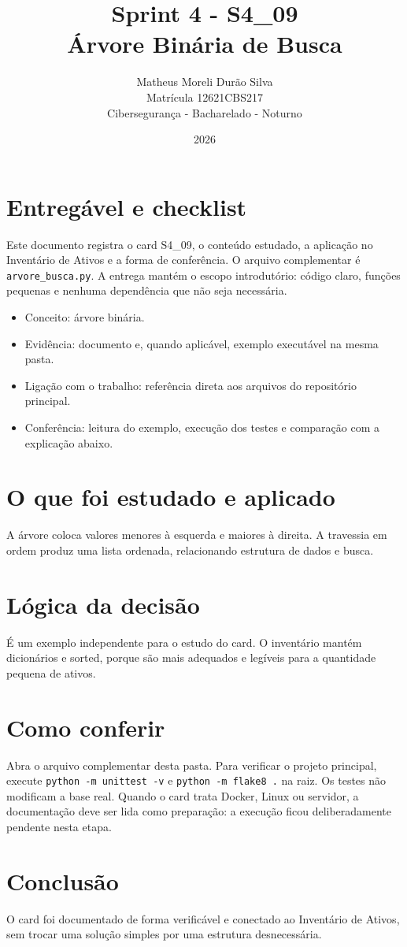 \documentclass[12pt]{article}
\title{Sprint 4 - S4\_09\\Árvore Binária de Busca}
\author{Matheus Moreli Durão Silva\\ Matrícula 12621CBS217\\ Cibersegurança - Bacharelado - Noturno}
\date{2026}
\begin{document}
\maketitle

\section*{Entregável e checklist}
Este documento registra o card S4\_09, o conteúdo estudado, a aplicação no Inventário de Ativos e a forma de conferência. O arquivo complementar é \texttt{arvore\_busca.py}. A entrega mantém o escopo introdutório: código claro, funções pequenas e nenhuma dependência que não seja necessária.

\begin{itemize}
\item Conceito: árvore binária.
\item Evidência: documento e, quando aplicável, exemplo executável na mesma pasta.
\item Ligação com o trabalho: referência direta aos arquivos do repositório principal.
\item Conferência: leitura do exemplo, execução dos testes e comparação com a explicação abaixo.
\end{itemize}

\section*{O que foi estudado e aplicado}
A árvore coloca valores menores à esquerda e maiores à direita. A travessia em ordem produz uma lista ordenada, relacionando estrutura de dados e busca.

\section*{Lógica da decisão}
É um exemplo independente para o estudo do card. O inventário mantém dicionários e sorted, porque são mais adequados e legíveis para a quantidade pequena de ativos.

\section*{Como conferir}
Abra o arquivo complementar desta pasta. Para verificar o projeto principal, execute \texttt{python -m unittest -v} e \texttt{python -m flake8 .} na raiz. Os testes não modificam a base real. Quando o card trata Docker, Linux ou servidor, a documentação deve ser lida como preparação: a execução ficou deliberadamente pendente nesta etapa.

\section*{Conclusão}
O card foi documentado de forma verificável e conectado ao Inventário de Ativos, sem trocar uma solução simples por uma estrutura desnecessária.
\end{document}
